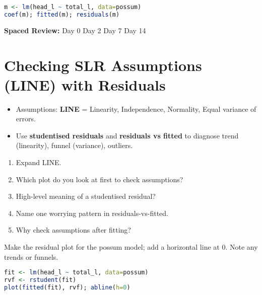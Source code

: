 \documentclass[11pt,a4paper]{article}
\newcommand{\reviewticks}{
  \vspace{0.4em}
  \noindent\scriptsize\textbf{Spaced Review:}
  \fbox{\phantom{D0}} Day 0\quad
  \fbox{\phantom{D2}} Day 2\quad
  \fbox{\phantom{D7}} Day 7\quad
  \fbox{\phantom{D14}} Day 14
}
\begin{document}
\begin{rbox}
\begin{lstlisting}[language=R]
m <- lm(head_l ~ total_l, data=possum)
coef(m); fitted(m); residuals(m)
\end{lstlisting}
\end{rbox}

\reviewticks

\section{Checking SLR Assumptions (LINE) with Residuals}

\begin{corebox}
\begin{itemize}
  \item Assumptions: \textbf{LINE} = Linearity, Independence, Normality, Equal variance of errors.
  \item Use \textbf{studentised residuals} and \textbf{residuals vs fitted} to diagnose trend (linearity), funnel (variance), outliers.
\end{itemize}
\end{corebox}

\begin{recallbox}
\begin{enumerate}
  \item Expand LINE.
  \item Which plot do you look at first to check assumptions?
  \item High-level meaning of a studentised residual?
  \item Name one worrying pattern in residuals-vs-fitted.
  \item Why check assumptions after fitting?
\end{enumerate}
\end{recallbox}

\begin{practicebox}
Make the residual plot for the possum model; add a horizontal line at 0. Note any trends or funnels.
\end{practicebox}

\begin{rbox}
\begin{lstlisting}[language=R]
fit <- lm(head_l ~ total_l, data=possum)
rvf <- rstudent(fit)
plot(fitted(fit), rvf); abline(h=0)
\end{lstlisting}
\end{rbox}
\end{document}
